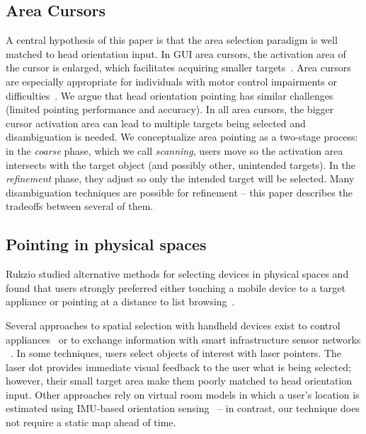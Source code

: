 \subsection{Area Cursors}
A central hypothesis of this paper is that the area selection paradigm is well matched to head orientation input. In GUI area cursors, the activation area of the cursor is enlarged, which facilitates acquiring smaller targets~\cite{kabbash1995prince}. Area cursors are especially appropriate for individuals with motor control impairments or difficulties~\cite{worden1997making,findlater2010enhanced}. We argue that head orientation pointing has similar challenges (limited pointing performance and accuracy). In all area cursors, the bigger cursor activation area can lead to multiple targets being selected and disambiguation is needed. 
We conceptualize area pointing as a two-stage process: in the {\em coarse} phase, which we call {\em scanning}, users move so the activation area intersects with the target object (and possibly other, unintended targets). In the {\em refinement} phase, they adjust so only the intended target will be selected. Many disambiguation techniques are possible for refinement -- this paper describes the tradeoffs between several of them.

\subsection{Pointing in physical spaces}
Rukzio studied alternative methods for selecting devices in physical spaces and found that users strongly preferred either touching a mobile device to a target appliance or pointing at a distance to list browsing~\cite{rukzio_experimental_2006}.

Several approaches to spatial selection with handheld devices exist to control appliances~\cite{beigl_point_1999,patel_2-way_2003,wilson_xwand:_2003,schmidt_picontrol:_2012,kemp_point-and-click_2008} or to exchange information with smart infrastructure sensor networks ~\cite{lifton_tricorder:_2007,mittal_ubicorder:_2011,costanza_sensortune:_2010}. In some techniques, users select objects of interest with laser pointers. The laser dot provides immediate visual feedback to the user what is being selected; however, their small target area make them poorly matched to head orientation input.
Other approaches rely on virtual room models in which a user's location is estimated using IMU-based orientation sensing~\cite{wilson_xwand:_2003,lifton_tricorder:_2007} -- in contrast, our technique does not require a static map ahead of time.

